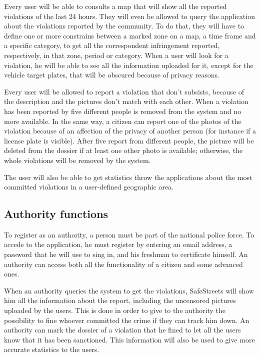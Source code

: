 \documentclass[../RASD.tex]{subfiles}
\begin{document}
    Every user will be able to consults a map that will show all the reported violations of the last 24 hours. They will even be allowed to query the application about the violations reported by the community. To do that, they will have to define one or more constrains between a marked zone on a map, a time frame and a specific category, to get all the correspondent infringement reported, respectively, in that zone, period or category. When a user will look for a violation, he will be able to see all the information uploaded for it, except for the vehicle target plates, that will be obscured because of privacy reasons.

    Every user will be allowed to report a violation that don’t subsists, because of the description and the pictures don’t match with each other. When a violation has been reported by five different people is removed from the system and no more available. In the same way, a citizen can report one of the photos of the violation because of an affection of the privacy of another person (for instance if a license plate is visible). After five report from different people, the picture will be deleted from the dossier if at least one other photo is available; otherwise, the whole violations will be removed by the system.

    The user will also be able to get statistics throw the applications about the most committed violations in a user-defined geographic area.
    \subsection{Authority functions}\label{subsec:authority-functions}
    To register as an authority, a person must be part of the national police force. To accede to the application, he must register by entering an email address, a password that he will use to sing in, and his freshman to certificate himself. An authority can access both all the functionality of a citizen and some advanced ones.

    When an authority queries the system to get the violations, SafeStreets will show him all the information about the report, including the uncensored pictures uploaded by the users. This is done in order to give to the authority the possibility to fine whoever committed the crime if they can track him down. An authority can mark the dossier of a violation that he fined to let all the users know that it has been sanctioned. This information will also be used to give more accurate statistics to the users.
\end{document}
